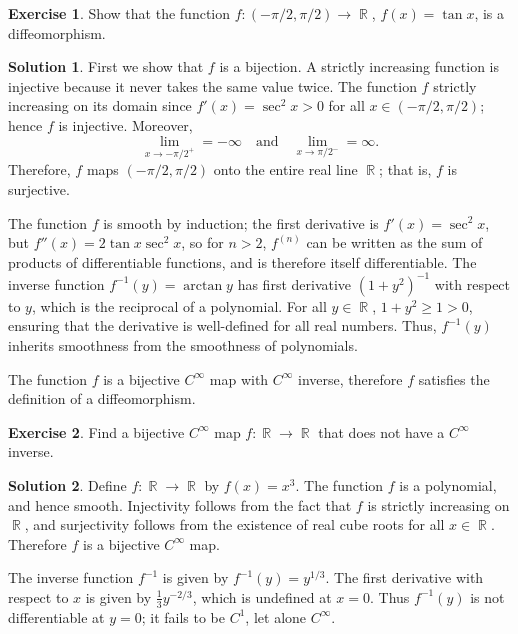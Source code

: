 \documentclass{article}
\theoremstyle{definition}
\newtheorem{exercise}{Exercise}
\newtheorem*{solution}{Solution}
\DeclareMathOperator{\R}{\mathbb{R}}
\begin{document}
\begin{exercise}
    Show that the function \(f:(-\pi/2,\pi/2)\to\R\), \(f(x)=\tan x\), is a diffeomorphism.
\end{exercise}
\begin{solution}
    First we show that \(f\) is a bijection. A strictly increasing function is injective because it never takes the same value twice. The function \(f\) strictly increasing on its domain since \(f'(x)=\sec^2 x>0\) for all \(x\in(-\pi/2,\pi/2)\); hence \(f\) is injective. Moreover, 
    \[\lim_{x\to-\pi/2^+}=-\infty\quad\text{and}\quad\lim_{x\to\pi/2^-}=\infty.\]
    Therefore, \(f\) maps \((-\pi/2,\pi/2)\) onto the entire real line \(\R\); that is, \(f\) is surjective. 
    
    The function \(f\) is smooth by induction; the first derivative is \(f'(x)=\sec^2 x\), but \(f''(x)=2\tan x\sec^2 x\), so for \(n>2\), \(f^{(n)}\) can be written as the sum of products of differentiable functions, and is therefore itself differentiable. The inverse function \(f^{-1}(y)=\arctan y\) has first derivative \((1+y^2)^{-1}\) with respect to \(y\), which is the reciprocal of a polynomial. For all \(y\in\R\), \(1+y^2\geq1>0\), ensuring that the derivative is well-defined for all real numbers. Thus, \(f^{-1}(y)\) inherits smoothness from the smoothness of polynomials.

    The function \(f\) is a bijective \(C^\infty\) map with \(C^\infty\) inverse, therefore \(f\) satisfies the definition of a diffeomorphism.
\end{solution}

\begin{exercise}
    Find a bijective \(C^\infty\) map \(f:\R\to\R\) that does not have a \(C^\infty\) inverse.
\end{exercise}
\begin{solution}
    Define \(f:\R\to\R\) by \(f(x)=x^3\). The function \(f\) is a polynomial, and hence smooth. Injectivity follows from the fact that \(f\) is strictly increasing on \(\R\), and surjectivity follows from the existence of real cube roots for all \(x\in\R\). Therefore \(f\) is a bijective \(C^\infty\) map.

    The inverse function \(f^{-1}\) is given by \(f^{-1}(y)=y^{1/3}\). The first derivative with respect to \(x\) is given by \(\frac{1}{3}y^{-2/3}\), which is undefined at \(x=0\). Thus \(f^{-1}(y)\) is not differentiable at \(y=0\); it fails to be \(C^1\), let alone \(C^\infty\).
\end{solution}
\end{document}
